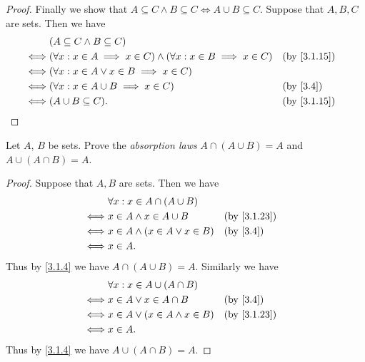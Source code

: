 \begin{proof}
  Finally we show that \(A \subseteq C \land B \subseteq C \iff A \cup B \subseteq C\).
  Suppose that \(A, B, C\) are sets.
  Then we have
  \begin{align*}
         & (A \subseteq C \land B \subseteq C)                                                                             \\
    \iff & (\forall x : x \in A \implies x \in C) \land (\forall x : x \in B \implies x \in C) &  & \by{3.1.15}            \\
    \iff & (\forall x : x \in A \lor x \in B \implies x \in C)                                                             \\
    \iff & (\forall x : x \in A \cup B \implies x \in C)                                       &  & \text{(by \cref{3.4})} \\
    \iff & (A \cup B \subseteq C).                                                             &  & \by{3.1.15}
  \end{align*}
\end{proof}

\begin{ex}\label{ex:3.1.8}
  Let \(A\), \(B\) be sets.
  Prove the \emph{absorption laws} \(A \cap (A \cup B) = A\) and \(A \cup (A \cap B) = A\).
\end{ex}

\begin{proof}
  Suppose that \(A, B\) are sets.
  Then we have
  \begin{align*}
         & \forall x : x \in A \cap (A \cup B)                              \\
    \iff & x \in A \land x \in A \cup B         &  & \by{3.1.23}            \\
    \iff & x \in A \land (x \in A \lor x \in B) &  & \text{(by \cref{3.4})} \\
    \iff & x \in A.
  \end{align*}
  Thus by \cref{3.1.4} we have \(A \cap (A \cup B) = A\).
  Similarly we have
  \begin{align*}
         & \forall x : x \in A \cup (A \cap B)                              \\
    \iff & x \in A \lor x \in A \cap B          &  & \text{(by \cref{3.4})} \\
    \iff & x \in A \lor (x \in A \land x \in B) &  & \by{3.1.23}            \\
    \iff & x \in A.
  \end{align*}
  Thus by \cref{3.1.4} we have \(A \cup (A \cap B) = A\).
\end{proof}

